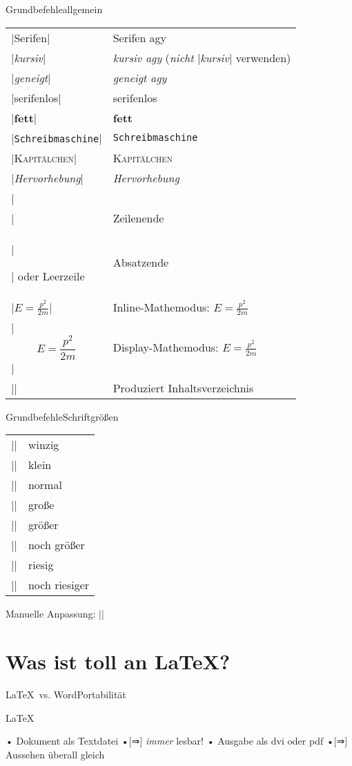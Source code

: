 \begin{frame}[c,fragile]{Grundbefehle}{allgemein}
\begin{tabular}{ll}
|\textrm{Serifen}| & \textrm{Serifen agy}\\
|\textit{kursiv}| & \textrm{\textit{kursiv agy}} (\emph{nicht} |{\it kursiv}| verwenden)\\
|\textsl{geneigt}| & \textrm{\textsl{geneigt agy}}\\
|\textsf{serifenlos}| & \textsf{serifenlos}\\
|\textbf{fett}| & \textbf{fett}\\
|\texttt{Schreibmaschine}| & \texttt{Schreibmaschine}\\
|\textsc{Kapitälchen}| & \textsc{Kapitälchen}\\
|\emph{Hervorhebung}| & \emph{Hervorhebung}\\
|\\| & Zeilenende\\
|\par| oder Leerzeile & Absatzende\\
|$E = \frac{p^2}{2m}$| & Inline-Mathemodus: $E = \frac{p^2}{2m}$\\
|\[E = \frac{p^2}{2m}\]| & Display-Mathemodus: $\displaystyle E = \frac{p^2}{2m}$\\ %
|\tableofcontents| & Produziert Inhaltsverzeichnis
\end{tabular}
\end{frame}

\begin{frame}[c,fragile]{Grundbefehle}{Schriftgrößen}
\begin{block}{}
\begin{tabular}{ll}
|\tiny| & \tiny winzig \\
|\small| & \small klein \\
|\normalsize| & \normalsize normal\\
|\large| & \large große\\
|\Large| & \Large größer\\
|\LARGE| & \LARGE noch größer\\
|\huge| & \huge riesig\\
|\Huge| & \Huge noch riesiger\\
\end{tabular}
\end{block}
Manuelle Anpassung: |\fontsize{10}{12}\selectfont|
\end{frame}

\section[Warum LaTeX?]{Was ist toll an \LaTeX?}
\begin{frame}{\LaTeX\ vs. Word}{Portabilität}
\begin{block}{\strut\LaTeX}
• Dokument als Textdatei
•[⇒] \emph{immer} lesbar!
• Ausgabe als dvi oder pdf
•[⇒] Aussehen überall gleich
\•
\end{block}
\end{frame}

